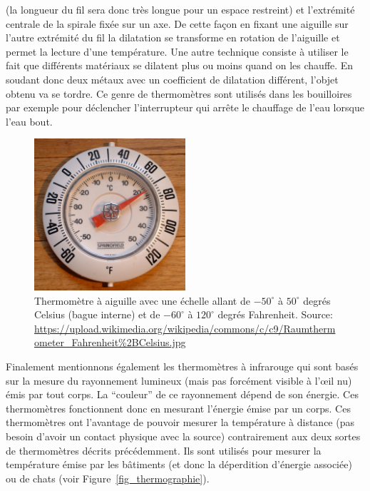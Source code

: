 \documentclass[a4paper,12pt]{book}
\begin{document}
(la longueur du fil sera donc très longue pour un espace restreint) et l'extrémité centrale de la spirale
fixée sur un axe. De cette façon en fixant une aiguille sur l'autre extrémité du fil la dilatation se transforme en rotation de 
l'aiguille et permet la lecture d'une température. Une autre technique consiste à utiliser le fait que différents matériaux 
se dilatent plus ou moins quand on les chauffe. En soudant donc deux métaux avec un coefficient de dilatation différent, 
l'objet obtenu va se tordre. Ce genre de thermomètres sont utilisés dans les bouilloires par exemple pour déclencher 
l'interrupteur qui arrête le chauffage de l'eau lorsque l'eau bout.
\begin{figure}
\begin{center}
\includegraphics[width=0.5\textwidth]{figs/thermo_c_f.jpg}
\caption{Thermomètre à aiguille avec une échelle allant de $-50^\circ$ à $50^\circ$ degrés Celsius (bague interne) et de $-60^\circ$ à $120^\circ$ 
degrés Fahrenheit. Source: \url{https://upload.wikimedia.org/wikipedia/commons/c/c9/Raumthermometer_Fahrenheit\%2BCelsius.jpg}}
\label{fig_thermo_aiguille}
\end{center}
\end{figure} 
Finalement mentionnons également les thermomètres à infrarouge qui sont basés sur la mesure du rayonnement lumineux (mais pas forcément visible à l’œil nu)
émis par tout corps. La ``couleur'' de ce rayonnement dépend de son énergie. Ces thermomètres fonctionnent donc en mesurant 
l'énergie émise par un corps. Ces thermomètres ont l'avantage de pouvoir mesurer la température à distance (pas besoin d'avoir un contact physique avec la source) contrairement aux deux sortes de thermomètres décrits précédemment. Ils sont utilisés pour mesurer
la température émise par les bâtiments (et donc la déperdition d'énergie associée) ou de chats (voir Figure~\ref{fig_thermographie}).
\end{document}
